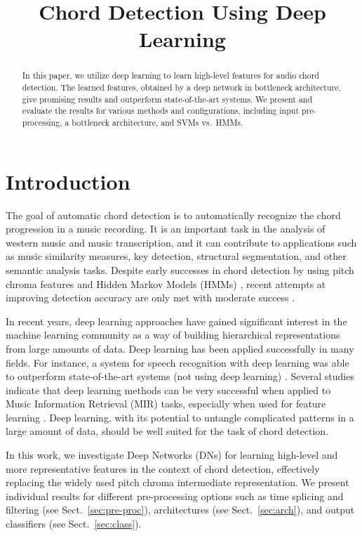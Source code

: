 \documentclass{article}
\title{Chord Detection Using Deep Learning}
\begin{document}
%
\maketitle
%
\begin{abstract}
In this paper, we utilize deep learning to learn high-level features for audio chord detection. The learned features, obtained by a deep network in bottleneck architecture, give promising results and outperform state-of-the-art systems. We present and evaluate the results for various methods and configurations, including input pre-processing, a bottleneck architecture, and SVMs vs.\ HMMs. 
\end{abstract}
%
\section{Introduction}
The goal of automatic chord detection is to automatically recognize the chord progression in a music recording. It is an important task in the analysis of western music and music transcription, and it can contribute to applications such as music similarity measures, key detection, structural segmentation, and other semantic analysis tasks. Despite early successes in chord detection by using pitch chroma features \cite{fujishima1999realtime} and Hidden Markov Models (HMMs) \cite{kawakami2000hidden}, recent attempts at improving detection accuracy are only met with moderate success \cite{ueda2010hmm,cho2013mirex}.

In recent years, deep learning approaches have gained significant interest in the machine learning community as a way of building hierarchical representations from large amounts of data. Deep learning has been applied successfully in many fields. For instance, a system for speech recognition with deep learning was able to outperform state-of-the-art systems (not using deep learning) \cite{hinton2012deep}. Several studies indicate that deep learning methods can be very successful when applied to Music Information Retrieval (MIR) tasks, especially when used for feature learning \cite{lee2009unsupervised,battenberg2012analyzing,humphrey2012moving,hamel2010learning}. Deep learning, with its potential to untangle complicated patterns in a large amount of data, should be well suited for the task of chord detection.

In this work, we investigate Deep Networks (DNs) for learning high-level and more representative features in the context of chord detection, effectively replacing the widely used pitch chroma intermediate representation. 
We present individual results for different pre-processing options such as time splicing and filtering (see Sect.~\ref{sec:pre-proc}), architectures (see Sect.~\ref{sec:arch}), and output classifiers (see Sect.~\ref{sec:class}). %
\end{document}
